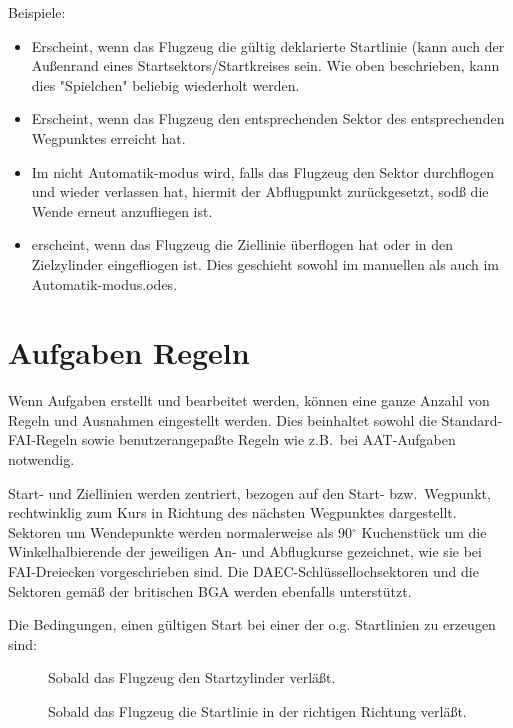 Beispiele:
\begin{itemize}
\item[\p{Aufgabenstart}]  Erscheint, wenn das Flugzeug die gültig deklarierte Startlinie (kann auch der Außenrand eines Startsektors/Startkreises sein. Wie oben beschrieben, kann dies "Spielchen" beliebig wiederholt werden.

\item[\p{Nächster Wendepunkt}]  Erscheint, wenn das Flugzeug den entsprechenden Sektor des entsprechenden Wegpunktes erreicht hat.

\item[\p{Abflugpunkt}] Im nicht Automatik-modus  wird, falls das Flugzeug den Sektor durchflogen und wieder verlassen hat, hiermit der Abflugpunkt zurückgesetzt, sodß die Wende erneut anzufliegen ist.

\item[\p{Aufgabenende}]  erscheint, wenn das Flugzeug die Ziellinie überflogen hat oder in den Zielzylinder  eingefliogen ist. Dies geschieht sowohl im manuellen als auch im Automatik-modus.odes.
\end{itemize}

\section{Aufgaben Regeln}\label{sec:task-rules}
Wenn Aufgaben erstellt und bearbeitet werden, können eine ganze Anzahl  von Regeln und Ausnahmen  eingestellt werden. Dies beinhaltet sowohl die Standard-FAI-Regeln sowie benutzerangepaßte Regeln wie z.B.\ bei AAT-Aufgaben notwendig.

Start- und Ziellinien werden zentriert, bezogen auf den Start- bzw.\  Wegpunkt, rechtwinklig zum Kurs in Richtung des nächsten Wegpunktes dargestellt.\\

 Sektoren um Wendepunkte werden normalerweise als 90$^\circ$ Kuchenstück um die Winkelhalbierende der jeweiligen An- und Abflugkurse gezeichnet, wie sie bei FAI-Dreiecken vorgeschrieben sind.
 Die DAEC-Schlüssellochsektoren und die Sektoren gemäß der britischen BGA werden ebenfalls unterstützt.

Die Bedingungen, einen gültigen Start bei einer der o.g. Startlinien zu erzeugen sind:
\begin{description}
\item[] Sobald das Flugzeug den Startzylinder verläßt.
\item[] Sobald das Flugzeug die Startlinie in der richtigen Richtung verläßt.
\end{description}

